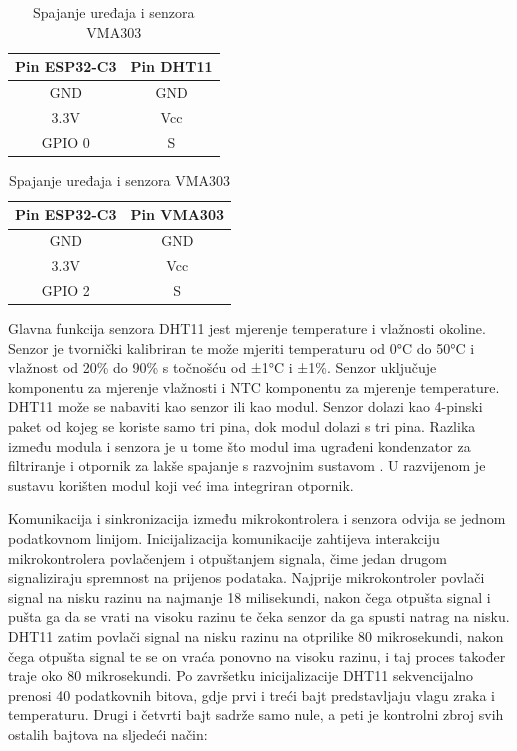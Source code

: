 \begin{table}[h]
	\centering
	\begin{minipage}{0.45\textwidth}
		\centering
		\begin{tabular}{|c|c|}
			\hline
			\rowcolor{lightblue}  
			\textbf{Pin ESP32-C3} & \textbf{Pin DHT11} \\ \hline
			GND & GND \\ \hline
			3.3V & Vcc \\ \hline
			GPIO 0 & S \\ \hline
		\end{tabular}
		\caption{Spajanje uređaja i modula DHT11}
		\label{table:pinout_dht11}
	\end{minipage}%
	\hspace{0.05\textwidth}
	\begin{minipage}{0.45\textwidth}
		\centering
		\begin{tabular}{|c|c|}
			\hline
			\rowcolor{lightblue}  
			\textbf{Pin ESP32-C3} & \textbf{Pin VMA303} \\ \hline
			GND & GND \\ \hline
			3.3V & Vcc \\ \hline
			GPIO 2 & S \\ \hline
		\end{tabular}
		\caption{Spajanje uređaja i senzora VMA303}
		\label{table:pinout_vma}
	\end{minipage}
\end{table}

Glavna funkcija senzora DHT11 jest mjerenje temperature i vlažnosti okoline. Senzor je tvornički kalibriran te može mjeriti temperaturu od 0°C do 50°C i vlažnost od 20\% do 90\% s točnošću od ±1°C i ±1\%. Senzor uključuje komponentu za mjerenje vlažnosti i NTC  komponentu za mjerenje temperature. DHT11 može se nabaviti kao senzor ili kao modul. Senzor dolazi kao 4-pinski paket od kojeg se koriste samo tri pina, dok modul dolazi s tri pina. Razlika između modula i senzora je u tome što modul ima ugrađeni kondenzator za filtriranje i otpornik za lakše spajanje s razvojnim sustavom \cite{dht11}. U razvijenom je sustavu korišten modul koji već ima integriran otpornik. 

Komunikacija i sinkronizacija između mikrokontrolera i senzora odvija se jednom podatkovnom linijom. Inicijalizacija komunikacije zahtijeva interakciju mikrokontrolera povlačenjem i otpuštanjem signala, čime jedan drugom signaliziraju spremnost na prijenos podataka. Najprije mikrokontroler povlači signal na nisku razinu na najmanje 18 milisekundi, nakon čega otpušta signal i pušta ga da se vrati na visoku razinu te čeka senzor da ga spusti natrag na nisku. DHT11 zatim povlači signal na nisku razinu na otprilike 80 mikrosekundi, nakon čega otpušta signal te se on vraća ponovno na visoku razinu, i taj proces također traje oko 80 mikrosekundi. Po završetku inicijalizacije DHT11 sekvencijalno prenosi 40 podatkovnih bitova, gdje prvi i treći bajt predstavljaju vlagu zraka i temperaturu. Drugi i četvrti bajt sadrže samo nule, a peti je kontrolni zbroj  svih ostalih bajtova na sljedeći način:

